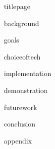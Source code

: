 \documentclass[12pt]{article}
\begin{document}
\doublespacing

{titlepage}

{background}

{goals}

{choiceoftech}

{implementation}

{demonstration}

{futurework}

{conclusion}

\singlespacing
{appendix}
\end{document}
